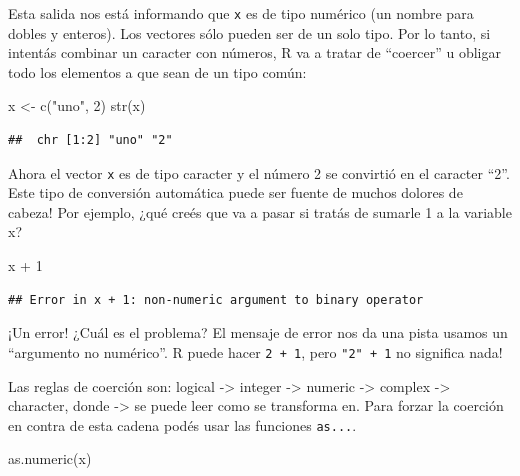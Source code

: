 \documentclass[
  openany]{book}
\newenvironment{Shaded}{\begin{snugshade}}{\end{snugshade}}
\newcommand{\DecValTok}[1]{\textcolor[rgb]{0.00,0.00,0.81}{#1}}
\newcommand{\FunctionTok}[1]{\textcolor[rgb]{0.00,0.00,0.00}{#1}}
\newcommand{\NormalTok}[1]{#1}
\newcommand{\OtherTok}[1]{\textcolor[rgb]{0.56,0.35,0.01}{#1}}
\newcommand{\SpecialCharTok}[1]{\textcolor[rgb]{0.00,0.00,0.00}{#1}}
\newcommand{\StringTok}[1]{\textcolor[rgb]{0.31,0.60,0.02}{#1}}
\begin{document}
Esta salida nos está informando que \texttt{x} es de tipo numérico (un nombre para dobles y enteros).
Los vectores sólo pueden ser de un solo tipo.
Por lo tanto, si intentás combinar un caracter con números, R va a tratar de ``coercer'' u obligar todo los elementos a que sean de un tipo común:

\begin{Shaded}
\begin{Highlighting}[]
\NormalTok{x }\OtherTok{\textless{}{-}} \FunctionTok{c}\NormalTok{(}\StringTok{"uno"}\NormalTok{, }\DecValTok{2}\NormalTok{)}
\FunctionTok{str}\NormalTok{(x)}
\end{Highlighting}
\end{Shaded}

\begin{verbatim}
##  chr [1:2] "uno" "2"
\end{verbatim}

Ahora el vector \texttt{x} es de tipo caracter y el número 2 se convirtió en el caracter ``2''.
Este tipo de conversión automática puede ser fuente de muchos dolores de cabeza!
Por ejemplo, ¿qué creés que va a pasar si tratás de sumarle 1 a la variable x?

\begin{Shaded}
\begin{Highlighting}[]
\NormalTok{x }\SpecialCharTok{+} \DecValTok{1}
\end{Highlighting}
\end{Shaded}

\begin{verbatim}
## Error in x + 1: non-numeric argument to binary operator
\end{verbatim}

¡Un error!
¿Cuál es el problema?
El mensaje de error nos da una pista usamos un ``argumento no numérico''.
R puede hacer \texttt{2\ +\ 1}, pero \texttt{"2"\ +\ 1} no significa nada!

Las reglas de coerción son: logical -\textgreater{} integer -\textgreater{} numeric -\textgreater{} complex -\textgreater{} character, donde -\textgreater{} se puede leer como se transforma en.
Para forzar la coerción en contra de esta cadena podés usar las funciones \texttt{as...}.

\begin{Shaded}
\begin{Highlighting}[]
\FunctionTok{as.numeric}\NormalTok{(x)}
\end{Highlighting}
\end{Shaded}
\end{document}
